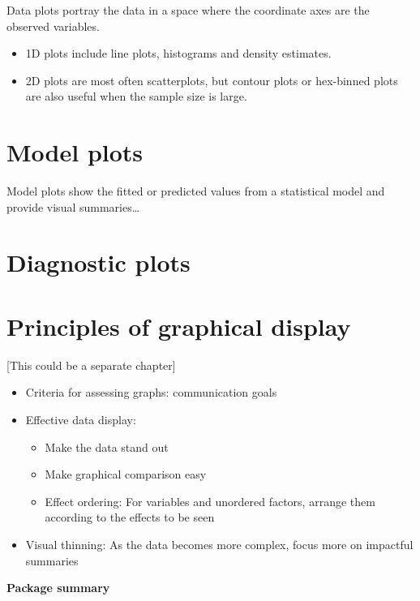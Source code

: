 \documentclass[
  letterpaper,
  10pt,
  krantz2]{krantz}
\providecommand{\tightlist}{%
  \setlength{\itemsep}{0pt}\setlength{\parskip}{0pt}}\usepackage{longtable,booktabs,array}
\begin{document}
Data plots portray the data in a space where the coordinate axes are the
observed variables.

\begin{itemize}
\tightlist
\item
  1D plots include line plots, histograms and density estimates.
\item
  2D plots are most often scatterplots, but contour plots or hex-binned
  plots are also useful when the sample size is large.
\end{itemize}

\section{Model plots}\label{model-plots}

Model plots show the fitted or predicted values from a statistical model
and provide visual summaries\ldots{}

\section{Diagnostic plots}\label{diagnostic-plots}

\section{Principles of graphical
display}\label{principles-of-graphical-display}

{[}This could be a separate chapter{]}

\begin{itemize}
\tightlist
\item
  Criteria for assessing graphs: communication goals
\item
  Effective data display:

  \begin{itemize}
  \tightlist
  \item
    Make the data stand out
  \item
    Make graphical comparison easy
  \item
    Effect ordering: For variables and unordered factors, arrange them
    according to the effects to be seen
  \end{itemize}
\item
  Visual thinning: As the data becomes more complex, focus more on
  impactful summaries
\end{itemize}

\textbf{Package summary}
\end{document}
